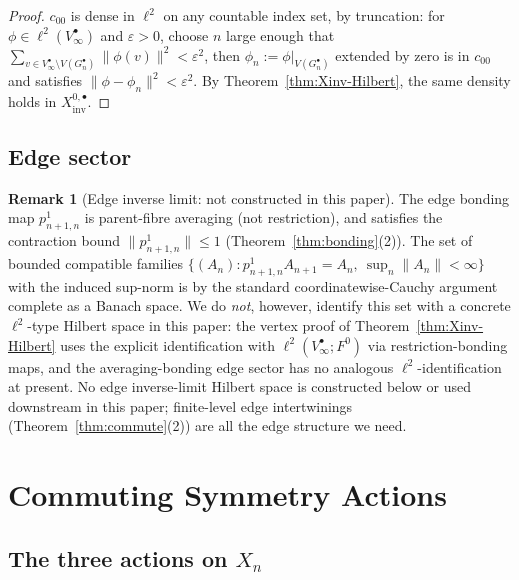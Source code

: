 \documentclass[11pt, a4paper]{amsart}
\theoremstyle{definition}
\newtheorem{remark}[theorem]{Remark}
\newcommand{\inv}{\mathrm{inv}}
\begin{document}
\begin{proof}
$c_{00}$ is dense in $\ell^2$ on any countable index set, by
truncation: for $\phi \in \ell^2(V_\infty^\bullet)$ and
$\varepsilon > 0$, choose $n$ large enough that $\sum_{v \in
V_\infty^\bullet \setminus V(G_n^\bullet)} \|\phi(v)\|^2 <
\varepsilon^2$, then $\phi_n := \phi|_{V(G_n^\bullet)}$ extended
by zero is in $c_{00}$ and satisfies $\|\phi - \phi_n\|^2 <
\varepsilon^2$. By Theorem~\ref{thm:Xinv-Hilbert}, the same
density holds in $X_\inv^{0, \bullet}$.
\end{proof}

\subsection{Edge sector}

\begin{remark}[Edge inverse limit: not constructed in this paper]
\label{rmk:edge-inv}
The edge bonding map $p_{n+1, n}^1$ is parent-fibre averaging
(not restriction), and satisfies the contraction bound
$\|p_{n+1,n}^1\| \leq 1$ (Theorem~\ref{thm:bonding}(2)). The set
of bounded compatible families
$\{(A_n) : p_{n+1, n}^1 A_{n+1} = A_n,\ \sup_n \|A_n\| < \infty\}$
with the induced sup-norm is by the standard coordinatewise-Cauchy
argument complete as a Banach space. We do \emph{not}, however,
identify this set with a concrete $\ell^2$-type Hilbert space in
this paper: the vertex proof of
Theorem~\ref{thm:Xinv-Hilbert} uses the explicit identification
with $\ell^2(V_\infty^\bullet; F^0)$ via restriction-bonding maps,
and the averaging-bonding edge sector has no analogous
$\ell^2$-identification at present. No edge inverse-limit Hilbert
space is constructed below or used downstream in this paper;
finite-level edge intertwinings (Theorem~\ref{thm:commute}(2))
are all the edge structure we need.
\end{remark}

\section{Commuting Symmetry Actions}
\label{sec:commute}

\subsection{The three actions on $X_n$}
\end{document}

